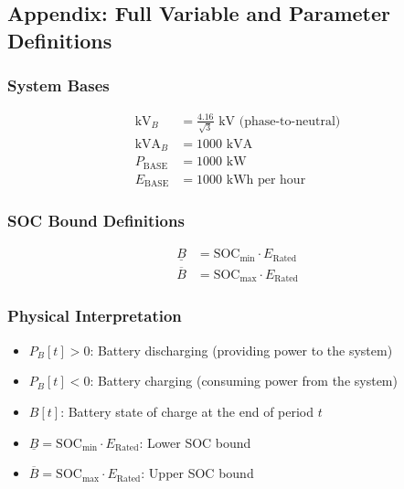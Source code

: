 \subsection{Appendix: Full Variable and Parameter Definitions}

\subsubsection{System Bases}
\begin{align}
\text{kV}_B &= \frac{4.16}{\sqrt{3}} \text{ kV (phase-to-neutral)} \\
\text{kVA}_B &= 1000 \text{ kVA} \\
P_{\text{BASE}} &= 1000 \text{ kW} \\
E_{\text{BASE}} &= 1000 \text{ kWh per hour}
\end{align}

\subsubsection{SOC Bound Definitions}
\begin{align}
\underline{B} &= \text{SOC}_{\min} \cdot E_{\text{Rated}} \\
\overline{B} &= \text{SOC}_{\max} \cdot E_{\text{Rated}}
\end{align}

\subsubsection{Physical Interpretation}
\begin{itemize}
    \item $P_B[t] > 0$: Battery discharging (providing power to the system)
    \item $P_B[t] < 0$: Battery charging (consuming power from the system)
    \item $B[t]$: Battery state of charge at the end of period $t$
    \item $\underline{B} = \text{SOC}_{\min} \cdot E_{\text{Rated}}$: Lower SOC bound
    \item $\overline{B} = \text{SOC}_{\max} \cdot E_{\text{Rated}}$: Upper SOC bound
\end{itemize}
